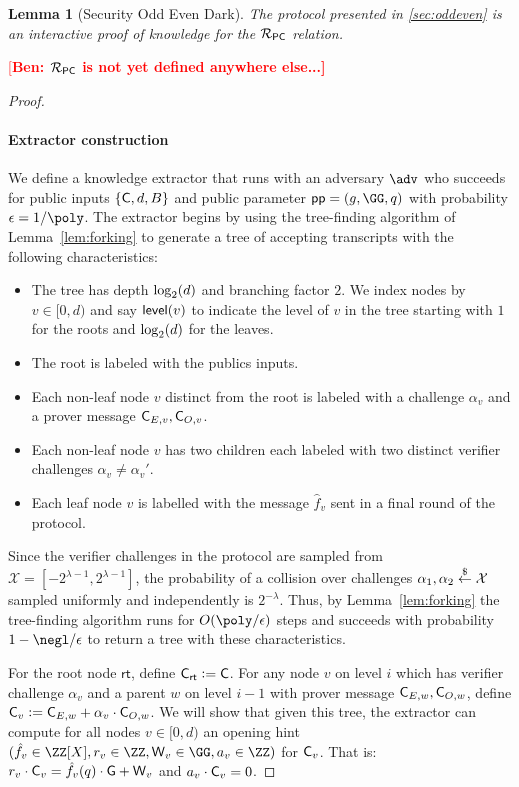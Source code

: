 \documentclass{article}
\theoremstyle{Definition}
\newtheorem{lemma}{Lemma}
\newcommand{\ben}[1]{{\textcolor{red}{[\bf Ben: #1]}}}
\newcommand{\ben}[1]{}
\begin{document}
	
\begin{lemma}[Security Odd Even Dark]
	The protocol presented in \cref{sec:oddeven} is an interactive proof of knowledge for the $\mathcal{R}_{\mathsf{PC}}$ relation.
\end{lemma}
\ben{$\mathcal{R}_{\mathsf{PC}}$ is not yet defined anywhere else...}
\begin{proof}

~\paragraph{Extractor construction}
		We define a knowledge extractor that runs with an adversary $\adv$ who succeeds for public inputs $\{\mathsf{C},d,B \}$ and public parameter $\crs=(g,\GG,q)$ with probability $\epsilon = 1/\poly$. The extractor begins by using the tree-finding algorithm of Lemma~\ref{lem:forking} to generate a tree of accepting transcripts with the following characteristics: 
\begin{itemize}
\item The tree has depth $\log_2(d)$ and branching factor $2$. We index nodes by $v \in [0, d)$ and say $\textsf{level}(v)$ to indicate the level of $v$ in the tree starting with $1$ for the roots and $\log_2(d)$ for the leaves.
\item The root is labeled with the publics inputs. 
\item Each non-leaf node $v$ distinct from the root is labeled with a challenge $\alpha_{v}$ and a prover message $\mathsf{C}_{E,v},\mathsf{C}_{O,v}$.
\item Each non-leaf node $v$ has two children each labeled with two distinct verifier challenges 
$\alpha_{v} \neq \alpha_{v}'$.
\item Each leaf node $v$ is labelled with the message $\hat{f}_v$ sent in a final round of the protocol. 
\end{itemize} 

Since the verifier challenges in the protocol are sampled from $\mathcal{X} = [-2^{\lambda -1}, 2^{\lambda -1}]$, the probability of a collision over challenges $\alpha_1, \alpha_2 \overset{\$}{\gets} \mathcal{X}$ sampled uniformly and independently is $2^{-\lambda}$. Thus, by Lemma~\ref{lem:forking} the tree-finding algorithm runs for $O(\poly/\epsilon)$ steps and succeeds with probability $1 - \negl/\epsilon$ to return a tree with these characteristics.

For the root node $\textsf{rt}$, define $\mathsf{C}_\textsf{rt} \mathrel{\mathop:}= \mathsf{C}$. For any node $v$ on level $i$ which has verifier challenge $\alpha_v$ and a parent $w$ on level $i-1$ with prover message $\mathsf{C}_{E,w},\mathsf{C}_{O,w}$, define $\mathsf{C}_v \mathrel{\mathop:}= \mathsf{C}_{E,w} + \alpha_v \cdot \mathsf{C}_{O,w}$.
We will show that given this tree, the extractor can compute for all nodes $v \in [0, d)$ an opening hint $(\hat{f}_v \in \ZZ[X],\denom_v \in \ZZ,\KnownOrderElement_v \in \GG, \KnownOrder_v \in \ZZ)$ for $\mathsf{C}_v$. That is: $r_v \cdot \mathsf{C}_v=\hat{f}_v(q) \cdot \mathsf{G} +\mathsf{W}_v$ and $a_v \cdot \mathsf{C}_v=0$. 


\end{proof}
\end{document}
